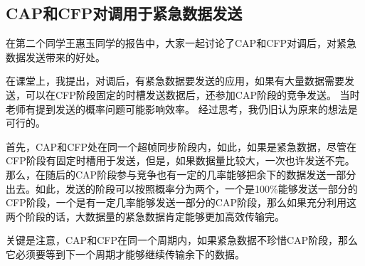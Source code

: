 \documentclass[a4paper]{ctexart}
\begin{document}
\subsection{CAP和CFP对调用于紧急数据发送}
在第二个同学王惠玉同学的报告中，大家一起讨论了CAP和CFP对调后，对紧急数据发送带来的好处。
\par
在课堂上，我提出，对调后，有紧急数据要发送的应用，如果有大量数据需要发送，可以在CFP阶段固定的时槽发送数据后，还参加CAP阶段的竞争发送。 当时老师有提到发送的概率问题可能影响效率。 经过思考，我仍旧认为原来的想法是可行的。
\par
首先，CAP和CFP处在同一个超帧同步阶段内，如此，如果是紧急数据，尽管在CFP阶段有固定时槽用于发送，但是，如果数据量比较大，一次也许发送不完。那么，在随后的CAP阶段参与竞争也有一定的几率能够把余下的数据发送一部分出去。如此，发送的阶段可以按照概率分为两个，一个是100\%能够发送一部分的CFP阶段，一个是有一定几率能够发送一部分的CAP阶段，那么如果充分利用这两个阶段的话，大数据量的紧急数据肯定能够更加高效传输完。
\par
关键是注意，CAP和CFP在同一个周期内，如果紧急数据不珍惜CAP阶段，那么它必须要等到下一个周期才能够继续传输余下的数据。
\end{document}
